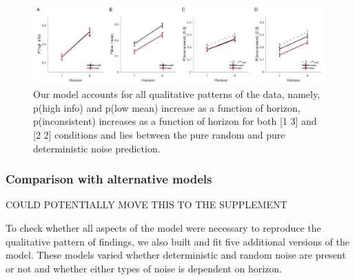 \documentclass[12pt]{article}
\begin{document}
\begin{figure}[H]
	\begin{center}
		\includegraphics[width=1\textwidth]{figures/RDBayes_2noise_modelA.jpg}
		\caption{
			Our model accounts for all qualitative patterns of the data, namely, p(high info) and p(low mean) increase as a function of horizon, p(inconsistent) increases as a function of horizon for both [1 3] and [2 2] conditions and lies between the pure random and pure deterministic noise prediction.}
		\label{fig:mb3}
	\end{center}
\end{figure}

\subsubsection*{Comparison with alternative models}
COULD POTENTIALLY MOVE THIS TO THE SUPPLEMENT

To check whether all aspects of the model were necessary to reproduce the qualitative pattern of findings, we also built and fit five additional versions of the model. These models varied  whether deterministic and random noise are present or not and whether either types of noise is dependent on horizon. 
	
\end{document}
